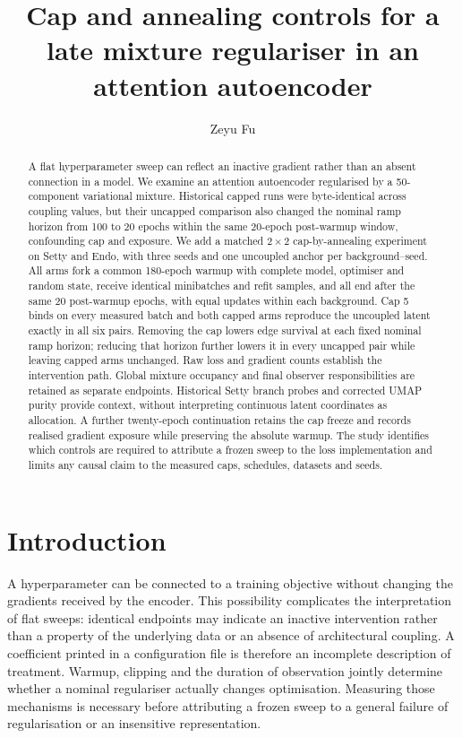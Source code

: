 \documentclass[11pt]{article}
\title{\textbf{Cap and annealing controls for a late mixture regulariser in an attention autoencoder}}
\author[1]{Zeyu Fu}
\affil[1]{State Key Laboratory of Trauma and Chemical Poisoning, Institute of Combined Injury,
Chongqing Engineering Research Center for Nanomedicine, College of Preventive Medicine,
Army Medical University, Chongqing, China\\
\texttt{fuzeyu09@gmail.com}}
\date{}
\begin{document}
\maketitle
\begin{abstract}
A flat hyperparameter sweep can reflect an inactive gradient rather than an absent connection in a model. We examine an attention autoencoder regularised by a 50-component variational mixture. Historical capped runs were byte-identical across coupling values, but their uncapped comparison also changed the nominal ramp horizon from 100 to 20 epochs within the same 20-epoch post-warmup window, confounding cap and exposure. We add a matched $2\times2$ cap-by-annealing experiment on Setty and Endo, with three seeds and one uncoupled anchor per background--seed. All arms fork a common 180-epoch warmup with complete model, optimiser and random state, receive identical minibatches and refit samples, and all end after the same 20 post-warmup epochs, with equal updates within each background. Cap 5 binds on every measured batch and both capped arms reproduce the uncoupled latent exactly in all six pairs. Removing the cap lowers edge survival at each fixed nominal ramp horizon; reducing that horizon further lowers it in every uncapped pair while leaving capped arms unchanged. Raw loss and gradient counts establish the intervention path. Global mixture occupancy and final observer responsibilities are retained as separate endpoints. Historical Setty branch probes and corrected UMAP purity provide context, without interpreting continuous latent coordinates as allocation. A further twenty-epoch continuation retains the cap freeze and records realised gradient exposure while preserving the absolute warmup. The study identifies which controls are required to attribute a frozen sweep to the loss implementation and limits any causal claim to the measured caps, schedules, datasets and seeds.
\end{abstract}

\section{Introduction}
A hyperparameter can be connected to a training objective without changing the gradients received by the encoder. This possibility complicates the interpretation of flat sweeps: identical endpoints may indicate an inactive intervention rather than a property of the underlying data or an absence of architectural coupling. A coefficient printed in a configuration file is therefore an incomplete description of treatment. Warmup, clipping and the duration of observation jointly determine whether a nominal regulariser actually changes optimisation. Measuring those mechanisms is necessary before attributing a frozen sweep to a general failure of regularisation or an insensitive representation.
\end{document}
